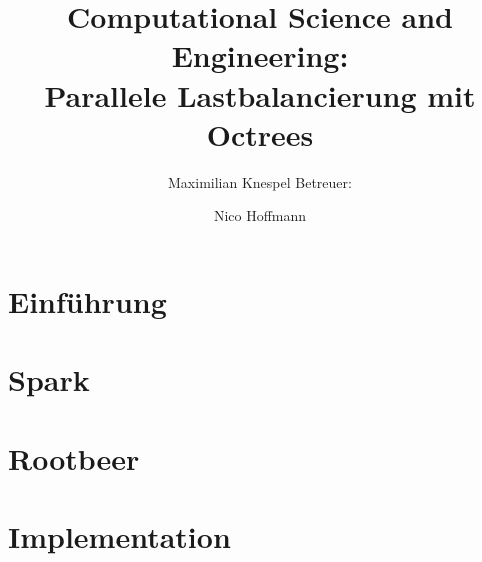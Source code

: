 \title{Computational Science and Engineering:\\Parallele Lastbalancierung mit Octrees}
\author {
	Maximilian Knespel
	\newline	\newline
	Betreuer: \and Nico Hoffmann
}
\date{}




\begin{frame}
	\titlepage
\end{frame}



\section{Einführung}



\section{Spark}



\section{Rootbeer}

%
%
%


\section{Implementation}



